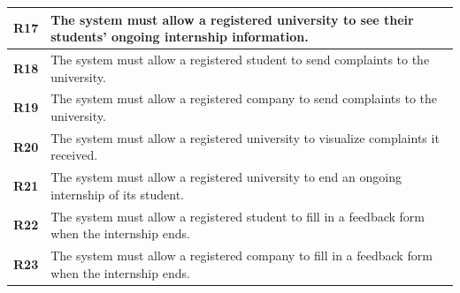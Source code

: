 \begin{table}[H]
\begin{tabular}{|l|m{10cm}|}
        \hline \textbf{R17} & The system must allow a registered university to see their students' ongoing internship information. \\
        \hline \textbf{R18} & The system must allow a registered student to send complaints to the university. \\
        \hline \textbf{R19} & The system must allow a registered company to send complaints to the university. \\
        \hline \textbf{R20} & The system must allow a registered university to visualize complaints it received. \\
        \hline \textbf{R21} & The system must allow a registered university to end an ongoing internship of its student. \\
        \hline \textbf{R22} & The system must allow a registered student to fill in a feedback form when the internship ends. \\
        \hline \textbf{R23} & The system must allow a registered company to fill in a feedback form when the internship ends. \\
        \hline
    \end{tabular}
\end{table}

